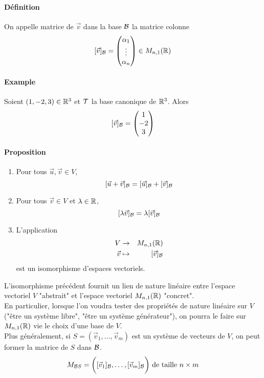 {\paragraph{Définition} On appelle  matrice de $\vec{v}$ dans la base $\mathcal{B}$ la matrice colonne 
$$[\vec{v}]_{\mathcal{B}} = 
\begin{pmatrix} 
  \alpha_1 \\ 
  \vdots \\ 
  \alpha_n 
\end{pmatrix} 
\in M_{n, 1}(\mathbb{R})$$

\paragraph{Example} Soient $(1, -2, 3) \in \mathbb{R}^3$ et $\mathcal{T}$ la base canonique de $\mathbb{R}^3$. Alors
$$[\vec{v}]_{\mathcal{B}} = 
\begin{pmatrix} 
  1 \\ 
  -2 \\ 
  3 
\end{pmatrix}$$

\paragraph{Proposition} 
\begin{enumerate}
  \item Pour tous $\vec{u}, \vec{v} \in V$, 
    $$[\vec{u} + \vec{v}]_{\mathcal{B}} = [\vec{u}]_{\mathcal{B}} + [\vec{v}]_{\mathcal{B}}$$
  \item Pour tous $\vec{v} \in V$ et $\lambda  \in \mathbb{R}$, 
    $$[\lambda \vec{v}]_{\mathcal{B}} = \lambda [\vec{v}]_{\mathcal{B}}$$
  \item L'application
    \begin{eqnarray*}
      V &\rightarrow& M_{n, 1}(\mathbb{R}) \\
      \vec{v} &\mapsto& [\vec{v}]_{\mathcal{B}}
    \end{eqnarray*}
    est un isomorphisme d'espaces vectoriels.
\end{enumerate}
L'isomorphisme précédent fournit un lien de nature linéaire entre l'espace vectoriel $V$ "abstrait" et l'espace vectoriel $M_{n, 1}(\mathbb{R})$ "concret". \\
En particulier, lorsque l'on voudra tester des propriétés de nature linéaire sur $V$ ("être un système libre", "être un système générateur"), on pourra le faire sur $M_{n, 1}(\mathbb{R})$ vie le choix d'une base de $V$. \\
Plus généralement, si $S=(\vec{v}_1, \ldots, \vec{v}_m)$ est un système de vecteurs de $V$, on peut former la matrice de $S$ dans $\mathcal{B}$.
$$M_{\mathcal{B} S} = \bigg( [\vec{v}_1]_{\mathcal{B}}, \ldots, [\vec{v}_m]_{\mathcal{B}} \bigg) \text{ de taille } n \times m$$

}
